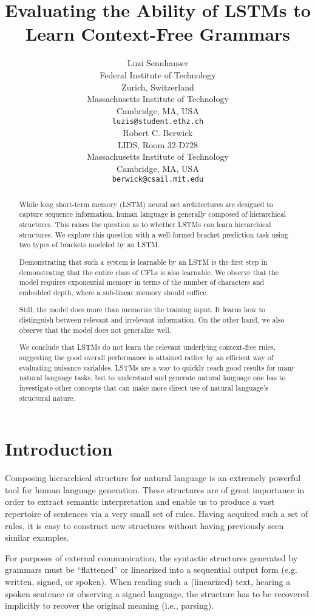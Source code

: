 \documentclass[11pt,a4paper]{article}
\title{Evaluating the Ability of LSTMs to Learn Context-Free Grammars}
\author{Luzi Sennhauser \\
  Federal Institute of Technology\\
  Zurich, Switzerland \\
  Massachusetts Institute of Technology\\
  Cambridge, MA, USA \\
  {\tt luzis@student.ethz.ch} \\\And
  Robert C. Berwick\\
  LIDS, Room 32-D728\\ 
  Massachusetts Institute of Technology \\
  Cambridge, MA, USA \\
  {\tt berwick@csail.mit.edu}
}
\date{}
\begin{document}
\maketitle
\begin{abstract}

While long short-term memory (LSTM) neural net architectures are designed to capture sequence information, human language is generally composed of hierarchical structures. This raises the question as to whether LSTMs can learn hierarchical structures. We explore this question with a well-formed bracket prediction task using two types of brackets modeled by an LSTM.

Demonstrating that such a system is learnable by an LSTM is the first step in demonstrating that the entire class of CFLs is also learnable. We observe that the model requires exponential memory in terms of the number of characters and embedded depth, where a sub-linear memory should suffice.

Still, the model does more than memorize the training input. It learns how to distinguish between relevant and irrelevant information. On the other hand, we also observe that the model does not generalize well.

We conclude that LSTMs do not learn the relevant underlying context-free rules, suggesting the good overall performance is attained rather by an efficient way of evaluating nuisance variables. LSTMs are a way to quickly reach good results for many natural language tasks, but to understand and generate natural language one has to investigate other concepts that can make more direct use of natural language's structural nature.
\end{abstract}

\section{Introduction}

Composing hierarchical structure for natural language is an extremely powerful tool for human language generation.  These structures are of great importance in order to extract semantic interpretation \cite{berwick2016only} and enable us to produce a vast repertoire of sentences via a very small set of rules. Having acquired such a set of rules, it is easy to construct new structures without having previously seen similar examples.

For purposes of external communication, the syntactic structures generated by grammars must be ``flattened'' or linearized into a sequential output form (e.g. written, signed, or spoken). When reading such a (linearized) text, hearing a spoken sentence or observing a signed language, the structure has to be recovered implicitly to recover the original meaning (i.e., parsing).
\end{document}
